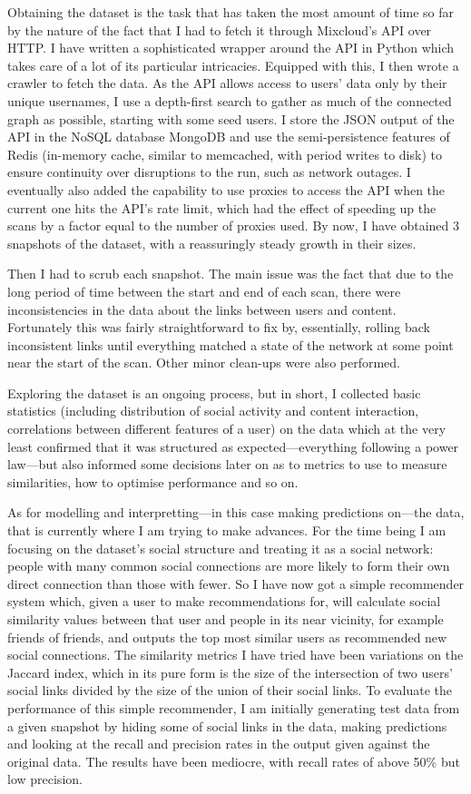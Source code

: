 \documentclass[a4paper,11pt,titlepage]{article}
\begin{document}
Obtaining the dataset is the task that has taken the most amount of time so far by the nature of the fact that I had to fetch it through Mixcloud's API over HTTP\@. I have written a sophisticated wrapper around the API in Python which takes care of a lot of its particular intricacies. Equipped with this, I then wrote a crawler to fetch the data. As the API allows access to users' data only by their unique usernames, I use a depth-first search to gather as much of the connected graph as possible, starting with some seed users. I store the JSON output of the API in the NoSQL database MongoDB and use the semi-persistence features of Redis (in-memory cache, similar to memcached, with period writes to disk) to ensure continuity over disruptions to the run, such as network outages. I eventually also added the capability to use proxies to access the API when the current one hits the API's rate limit, which had the effect of speeding up the scans by a factor equal to the number of proxies used. By now, I have obtained 3 snapshots of the dataset, with a reassuringly steady growth in their sizes.

Then I had to scrub each snapshot. The main issue was the fact that due to the long period of time between the start and end of each scan, there were inconsistencies in the data about the links between users and content. Fortunately this was fairly straightforward to fix by, essentially, rolling back inconsistent links until everything matched a state of the network at some point near the start of the scan. Other minor clean-ups were also performed.

Exploring the dataset is an ongoing process, but in short, I collected basic statistics (including distribution of social activity and content interaction, correlations between different features of a user) on the data which at the very least confirmed that it was structured as expected---everything following a power law---but also informed some decisions later on as to metrics to use to measure similarities, how to optimise performance and so on.

As for modelling and interpretting---in this case making predictions on---the data, that is currently where I am trying to make advances. For the time being I am focusing on the dataset's social structure and treating it as a social network: people with many common social connections are more likely to form their own direct connection than those with fewer. So I have now got a simple recommender system which, given a user to make recommendations for, will calculate social similarity values between that user and people in its near vicinity, for example friends of friends, and outputs the top most similar users as recommended new social connections. The similarity metrics I have tried have been variations on the Jaccard index, which in its pure form is the size of the intersection of two users' social links divided by the size of the union of their social links. To evaluate the performance of this simple recommender, I am initially generating test data from a given snapshot by hiding some of social links in the data, making predictions and looking at the recall and precision rates in the output given against the original data. The results have been mediocre, with recall rates of above 50\% but low precision.
\end{document}
